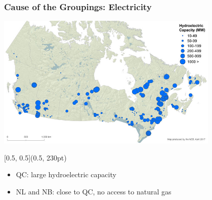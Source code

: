 \documentclass{beamer}
\begin{document}
\begin{frame}
\frametitle{Cause of the Groupings: Electricity}
\vspace{-30pt}
\begin{center}
\includegraphics[width=0.8\textwidth]{hydroPower.jpg}
\end{center}

\begin{textblock*}{\textwidth}[0.5, 0.5](0.5\linewidth, 230pt)
\begin{itemize}
	\item QC: large hydroelectric capacity
	\item  NL and NB: close to QC, no access to natural gas  
\end{itemize}
\end{textblock*}
\end{frame}
\end{document}
